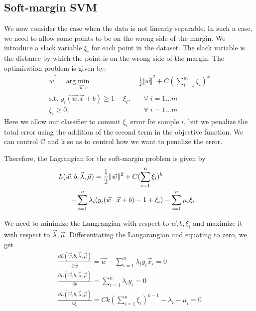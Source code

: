 \documentclass[journal]{IEEEtran}
\begin{document}
\subsection{Soft-margin SVM}
We now consider the case when the data is not linearly separable. In such a case, we need to allow some points to be on the wrong side of the margin. We introduce a slack variable $\xi_i$ for each point in the dataset. The slack variable is the distance by which the point is on the wrong side of the margin. The optimisation problem is given by:-
\begin{align}
    \vec{w}^* = \text{arg}\min_{\vec{w}, b}&\; \frac{1}{2} \Vert {\vec{w} \Vert}^2 + C \left( \sum_{i=1}^{m} \xi_i \right) ^ k\\
    \text{s.t. } y_i(\vec{w}.\vec{x} + b) \geq 1 - \xi_i, &\quad \forall\; i = 1...m \nonumber \\
    \xi_i \geq 0, &\quad \forall\; i = 1...m \nonumber
\end{align}
Here we allow our classifier to commit $\xi_i$ error for sample $i$, but we penalize the total error using the addition of the second term in the objective function. We can control C and k so as to control how we want to penalize the error.

Therefore, the Lagrangian for the soft-margin problem is given by
\begin{align}
    L(\vec{w}, b, \vec{\lambda}, \vec{\mu}) = \frac{1}{2} \Vert \vec{w} \Vert^2 + C (\sum_{i=1}^{n} \xi_i)^k \notag \\
    \quad\quad- \sum_{i=1}^{n} \lambda_i (y_i(\vec{w} \cdot \vec{x} + b) - 1 + \xi_i) &- \sum_{i=1}^{n} \mu_i \xi_i
\end{align}

We need to minimize the Langrangian with respect to $\vec{w}, b, \xi_i$ and maximize it with respect to $\vec{\lambda}, \vec{\mu}$. Differentiating the Langarangian and equating to zero, we get
\begin{gather}
    \frac{\partial L(\vec{w}, b, \vec{\lambda}, \vec{\mu})}{\partial \vec{w}} = \vec{w} - \sum_{i=1}^{n} \lambda_i y_i \vec{x}_i = 0 \\
    \frac{\partial L(\vec{w}, b, \vec{\lambda}, \vec{\mu})}{\partial b} = \sum_{i=1}^{n} \lambda_i y_i = 0 \\
    \frac{\partial L(\vec{w}, b, \vec{\lambda}, \vec{\mu})}{\partial \xi_i} = Ck(\sum_{i=1}^{n} \xi_i)^{k-1} - \lambda_i - \mu_i = 0
\end{gather}
\end{document}
